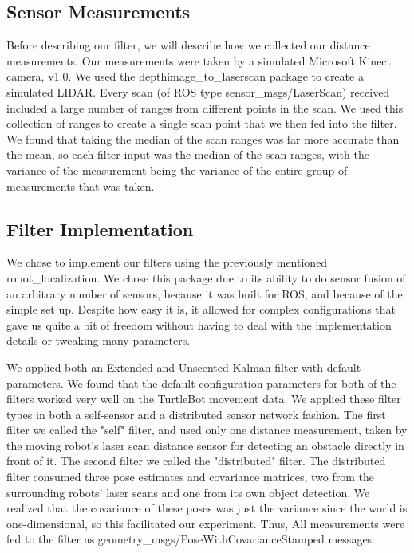 \documentclass[conference]{IEEEtran} \usepackage[T1]{fontenc} \usepackage[backend=biber, style=ieee]{biblatex}
\begin{document}
\subsection{Sensor Measurements} \label{Sensor Measurements} Before describing our filter, we will describe how we
collected our distance measurements. Our measurements were taken by a simulated Microsoft Kinect camera, v1.0. We used
the depthimage\_to\_laserscan package \cite{depth_to_scan} to create a simulated LIDAR. Every scan (of ROS type
sensor\_msgs/LaserScan) received included a large number of ranges from different points in the scan. We used this
collection of ranges to create a single scan point that we then fed into the filter. We found that taking the median of
the scan ranges was far more accurate than the mean, so each filter input was the median of the scan ranges, with the
variance of the measurement being the variance of the entire group of measurements that was taken.

\subsection{Filter Implementation} \label{Filter Implementation} We chose to implement our filters using the previously
mentioned robot\_localization. We chose this package due to its ability to do sensor fusion of an arbitrary number of
sensors, because it was built for ROS, and because of the simple set up. Despite how easy it is, it allowed for complex configurations 
that gave us quite a bit of freedom without having to deal with the implementation details or tweaking many parameters.  

We applied both an Extended and Unscented Kalman filter with default parameters. We found that the default configuration 
parameters for both of the filters worked very well on the TurtleBot movement data. We applied these filter types in both
a self-sensor and a distributed sensor network fashion. The first filter we called the "self" filter, and
used only one distance measurement, taken by the moving robot's laser scan distance sensor for detecting an obstacle directly in front 
of it. The second filter we called the "distributed" filter. The distributed filter consumed three pose estimates and covariance matrices, 
two from the surrounding robots' laser scans and one from its own object detection. We realized that the covariance of these poses was just 
the variance since the world is one-dimensional, so this facilitated our experiment. Thus,  All measurements were fed to the filter as geometry\_msgs/PoseWithCovarianceStamped messages.
\end{document}
